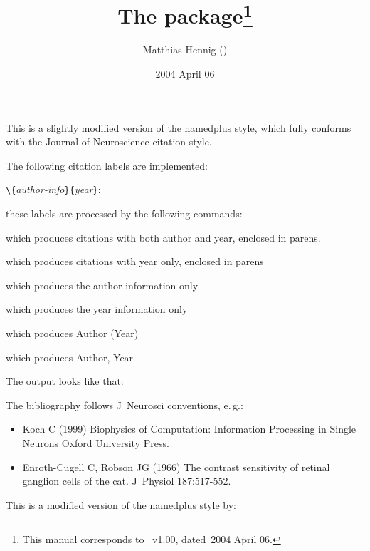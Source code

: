 \documentclass[DIV=8, parskip=half, pagesize=auto]{scrartcl}
\title{The \pkg{jneurosci} package\thanks{This manual corresponds to \pkg{jneurosci}~v1.00, dated~2004 April 06.}}
\author{Matthias Hennig (\mail{hennig@cn.stir.ac.uk})}
\date{2004 April 06}
\makeatletter
\newcommand*{\pkg}[1]{\textsf{#1}}
\newcommand*{\cs}[1]{\texttt{\textbackslash#1}}
\newcommand*{\cmd}[1]{\cs{\expandafter\@gobble\string#1}}
\newcommand*{\meta}[1]{\textlangle\textsl{#1}\textrangle}
\newcommand*{\marg}[1]{\texttt{\{}\meta{#1}\texttt{\}}}
\makeatother
\begin{document}
\maketitle

\noindent
This is a slightly modified version of the \pkg{namedplus} style, which fully conforms
with the Journal of Neuroscience citation style.

The following citation labels are implemented:
%
\begin{labeling}{\cmd{\citeauthoryear}\marg{author-info}\marg{year}:}
\item[\cmd{\citeauthoryear}\marg{author-info}\marg{year}:] these labels are processed by the following commands: 
\item[\cmd{\cite}\marg{key}:] which produces citations with both author and year, enclosed in parens. 
\item[\cmd{\shortcite}\marg{key}:] which produces citations with year only, enclosed in parens 
\item[\cmd{\citeauthor}\marg{key}:] which produces the author information only 
\item[\cmd{\citeyear}\marg{key}:] which produces the year information only 
\item[\cmd{\citetext}\marg{key}:] which produces Author (Year) 
\item[\cmd{\citenoparens}\marg{key}:] which produces Author, Year 
\end{labeling}

The output looks like that:
%

The bibliography follows J~Neurosci conventions, e.\,g.:
%
\begin{itemize}
\item Koch C (1999) Biophysics of Computation: Information Processing in Single Neurons Oxford University Press.
\item Enroth-Cugell C, Robson JG (1966) The contrast sensitivity of retinal ganglion cells of the cat. J~Physiol 187:517-552. 
\end{itemize}
 
This is a modified version of the \pkg{namedplus} style by:
\end{document}
